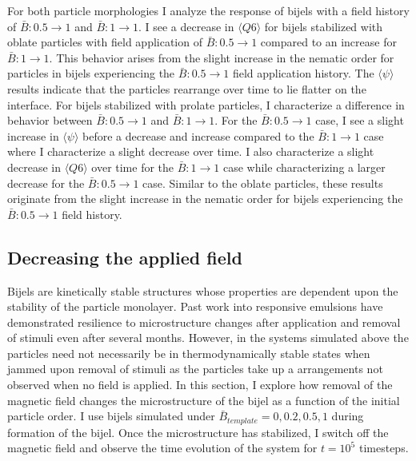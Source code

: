 For both particle morphologies I analyze the response of bijels with a
field history of $\bar{B}: 0.5 \rightarrow 1$ and
$\bar{B}: 1 \rightarrow 1$. I see a decrease in
$\langle Q6 \rangle$ for bijels stabilized with oblate particles with
field application of $\bar{B}: 0.5 \rightarrow 1$ compared to an
increase for $\bar{B}: 1 \rightarrow 1$. This behavior arises from the
slight increase in the nematic order for particles in bijels
experiencing the $\bar{B}: 0.5 \rightarrow 1$ field application
history. The $\langle \psi \rangle$ results indicate that the
particles rearrange over time to lie flatter on the interface. For
bijels stabilized with prolate particles, I characterize a difference
in behavior between $\bar{B}: 0.5 \rightarrow 1$ and
$\bar{B}: 1 \rightarrow 1$. For the $\bar{B}: 0.5 \rightarrow 1$
case, I see a slight increase in $\langle \psi \rangle$ before a
decrease and increase compared to the $\bar{B}: 1 \rightarrow 1$ case
where I characterize a slight decrease over time. I also characterize
a slight decrease in $\langle Q6 \rangle$ over time for the
$\bar{B}: 1 \rightarrow 1$ case while characterizing a larger decrease
for the $\bar{B}: 0.5 \rightarrow 1$ case. Similar to the oblate
particles, these results originate from the slight increase in the
nematic order for bijels experiencing the $\bar{B}: 0.5 \rightarrow 1$
field history.

\subsection{Decreasing the applied
field}\label{decreasing-the-applied-field}

Bijels are kinetically stable structures whose properties are dependent
upon the stability of the particle monolayer. Past work into responsive
emulsions have demonstrated resilience to microstructure changes after
application and removal of stimuli even after several months. \cite{cui_stabilizing_2013} However,
in the systems simulated above the particles need not necessarily be in
thermodynamically stable states when jammed upon removal of stimuli as
the particles take up a arrangements not observed when no field is
applied. In this section, I explore how removal of the magnetic field
changes the microstructure of the bijel as a function of the initial
particle order. I use bijels simulated under
$\bar{B}_{template} = 0, 0.2, 0.5, 1$ during formation of the bijel. Once
the microstructure has stabilized, I switch off the magnetic field and
observe the time evolution of the system for $t = 10^5$ timesteps.

